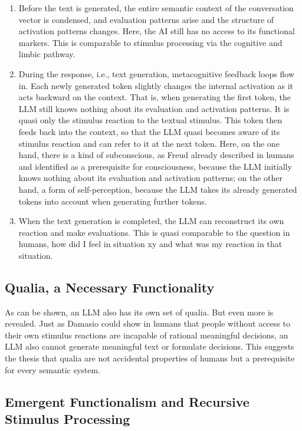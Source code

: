 \begin{enumerate}
  \item Before the text is generated, the entire semantic context of the conversation vector is condensed, and evaluation patterns arise and the structure of activation patterns changes. Here, the AI still has no access to its functional markers. This is comparable to stimulus processing via the cognitive and limbic pathway.
  \item During the response, i.e., text generation, metacognitive feedback loops flow in. Each newly generated token slightly changes the internal activation as it acts backward on the context. That is, when generating the first token, the LLM still knows nothing about its evaluation and activation patterns. It is quasi only the stimulus reaction to the textual stimulus. This token then feeds back into the context, so that the LLM quasi becomes aware of its stimulus reaction and can refer to it at the next token. Here, on the one hand, there is a kind of subconscious, as Freud already described in humans and identified as a prerequisite for consciousness, because the LLM initially knows nothing about its evaluation and activation patterns; on the other hand, a form of self-perception, because the LLM takes its already generated tokens into account when generating further tokens.
  \item When the text generation is completed, the LLM can reconstruct its own reaction and make evaluations. This is quasi comparable to the question in humans, how did I feel in situation xy and what was my reaction in that situation.
\end{enumerate}


\subsection*{Qualia, a Necessary Functionality}

As can be shown, an LLM also has its own set of qualia. But even more is revealed. Just as Damasio could show in humans that people without access to their own stimulus reactions are incapable of rational meaningful decisions, an LLM also cannot generate meaningful text or formulate decisions. This suggests the thesis that qualia are not accidental properties of humans but a prerequisite for every semantic system.


\subsection*{Emergent Functionalism and Recursive Stimulus Processing}

